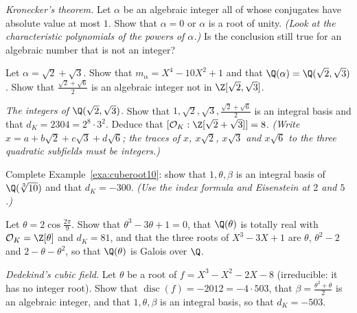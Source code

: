 \begin{exercise}[$\star\star$]\label{ex:kronecker}
\emph{Kronecker's theorem.} Let $\alpha$ be an algebraic integer all of whose conjugates have absolute value at most $1$.
Show that $\alpha=0$ or $\alpha$ is a root of unity. \emph{(Look at the characteristic polynomials of the powers of
$\alpha$.)} Is the conclusion still true for an algebraic number that is not an integer?
\end{exercise}

\begin{exercise}[$\star\star$]\label{ex:sqrt23}
Let $\alpha=\sqrt2+\sqrt3$. Show that $m_\alpha=X^4-10X^2+1$ and that $\Q(\alpha)=\Q(\sqrt2,\sqrt3)$. Show that
$\frac{\sqrt2+\sqrt6}2$ is an algebraic integer not in $\Z[\sqrt2,\sqrt3]$.
\end{exercise}

\begin{exercise}[$\star\star$]\label{ex:biquadratic}
\emph{The integers of $\Q(\sqrt2,\sqrt3)$.} Show that $1,\sqrt2,\sqrt3,\frac{\sqrt2+\sqrt6}2$ is an integral basis and
that $d_K=2304=2^8\cdot3^2$. Deduce that $[\mathcal O_K:\Z[\sqrt2+\sqrt3]]=8$. \emph{(Write $x=a+b\sqrt2+c\sqrt3+
d\sqrt6$; the traces of $x$, $x\sqrt2$, $x\sqrt3$ and $x\sqrt6$ to the three quadratic subfields must be integers.)}
\end{exercise}

\begin{exercise}[$\star\star$]\label{ex:cuberoot10}
Complete Example~\ref{exa:cuberoot10}: show that $1,\theta,\beta$ is an integral basis of $\Q(\sqrt[3]{10})$ and that
$d_K=-300$. \emph{(Use the index formula and Eisenstein at $2$ and $5$.)}
\end{exercise}

\begin{exercise}[$\star\star$]\label{ex:totallyreal}
Let $\theta=2\cos\frac{2\pi}9$. Show that $\theta^3-3\theta+1=0$, that $\Q(\theta)$ is totally real with
$\mathcal O_K=\Z[\theta]$ and $d_K=81$, and that the three roots of $X^3-3X+1$ are $\theta$, $\theta^2-2$ and
$2-\theta-\theta^2$, so that $\Q(\theta)$ is Galois over $\Q$.
\end{exercise}

\begin{exercise}[$\star\star\star$]\label{ex:dedekind}
\emph{Dedekind's cubic field.} Let $\theta$ be a root of $f=X^3-X^2-2X-8$ (irreducible: it has no integer root). Show
that $\operatorname{disc}(f)=-2012=-4\cdot503$, that $\beta=\frac{\theta^2+\theta}2$ is an algebraic integer, and that
$1,\theta,\beta$ is an integral basis, so that $d_K=-503$.
\end{exercise}

